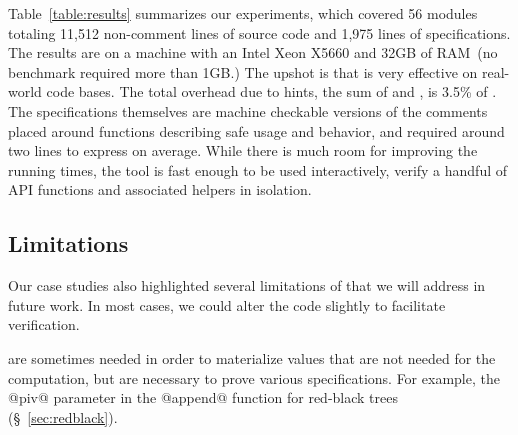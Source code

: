 Table~\ref{table:results} summarizes our experiments, which covered 56 modules
totaling 11,512 non-comment lines of source code and 1,975 lines of specifications.
%
The results are on a machine with an Intel Xeon X5660 and 32GB of RAM~(no benchmark required more than 1GB.)
%
The upshot is that \toolname is very effective on real-world code bases.
%
The total overhead due to hints, \ie the sum of \bfAnnot and \bfQualif, is 3.5\% of \bfLOC.
%
The specifications themselves are machine checkable versions of the comments 
placed around functions describing safe usage and behavior, and required around
two lines to express on average.
%
%
%
%
While there is much room for improving the running times, the tool is fast enough 
to be used interactively, verify a handful of API functions and associated helpers 
in isolation.

\subsection{Limitations}\label{sec:discussion}

Our case studies also highlighted several limitations
of \toolname that we will address in future work. 
In most cases, we could alter the code slightly to 
facilitate verification. 

 are sometimes needed in 
order to materialize values that are not needed 
for the computation, but are necessary to prove 
various specifications. For example, the @piv@ 
parameter in the @append@ function for red-black trees
(\S~\ref{sec:redblack}).

